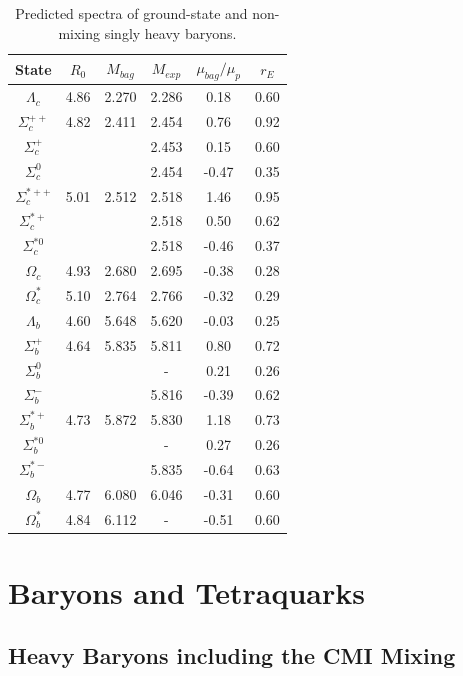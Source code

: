 \documentclass[prd,twocolumn,floatfix,nofootinbib]{revtex4}
\begin{document}
\renewcommand{\tabcolsep}{0.37cm} \renewcommand{\arraystretch}{1.3}
\begin{table}[!htb]
\caption{Predicted spectra of ground-state and non-mixing singly heavy
baryons.}
\label{tab:1heavybaryon}%
\begin{tabular}{cccccc}
\hline\hline
\textrm{State} & $R_{0}$ & $M_{bag}$ & $M_{exp}$ & $\mu_{bag}/\mu_{p}$ & $%
r_{E}$ \\ \hline
$\Lambda_{c}$ & 4.86 & 2.270 & 2.286 & 0.18 & 0.60 \\
$\Sigma_{c}^{++}$ & 4.82 & 2.411 & 2.454 & 0.76 & 0.92 \\
$\Sigma_{c}^{+}$ &  &  & 2.453 & 0.15 & 0.60 \\
$\Sigma_{c}^{0}$ &  &  & 2.454 & -0.47 & 0.35 \\
$\Sigma_{c}^{\ast ++}$ & 5.01 & 2.512 & 2.518 & 1.46 & 0.95 \\
$\Sigma_{c}^{\ast +}$ &  &  & 2.518 & 0.50 & 0.62 \\
$\Sigma_{c}^{\ast 0}$ &  &  & 2.518 & -0.46 & 0.37 \\
$\Omega_{c}$ & 4.93 & 2.680 & 2.695 & -0.38 & 0.28 \\
$\Omega_{c}^{\ast}$ & 5.10 & 2.764 & 2.766 & -0.32 & 0.29 \\
$\Lambda_{b}$ & 4.60 & 5.648 & 5.620 & -0.03 & 0.25 \\
$\Sigma_{b}^{+}$ & 4.64 & 5.835 & 5.811 & 0.80 & 0.72 \\
$\Sigma_{b}^{0}$ &  &  & - & 0.21 & 0.26 \\
$\Sigma_{b}^{-}$ &  &  & 5.816 & -0.39 & 0.62 \\
$\Sigma_{b}^{\ast +}$ & 4.73 & 5.872 & 5.830 & 1.18 & 0.73 \\
$\Sigma_{b}^{\ast 0}$ &  &  & - & 0.27 & 0.26 \\
$\Sigma_{b}^{\ast -}$ &  &  & 5.835 & -0.64 & 0.63 \\
$\Omega_{b}$ & 4.77 & 6.080 & 6.046 & -0.31 & 0.60 \\
$\Omega_{b}^{\ast}$ & 4.84 & 6.112 & - & -0.51 & 0.60 \\ \hline\hline
\end{tabular}%
\end{table}

\section{Baryons and Tetraquarks}

\label{Hadrons}

\subsection{Heavy Baryons including the CMI Mixing}
\end{document}
